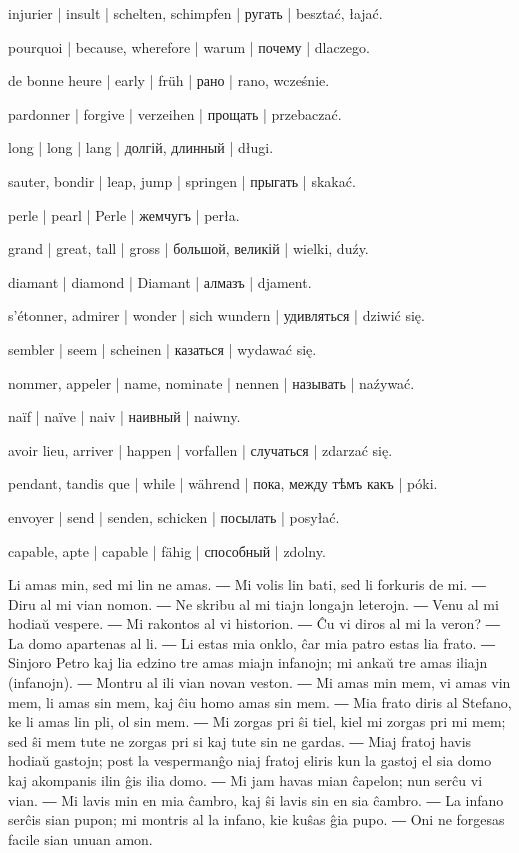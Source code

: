 \begin{ekzvocab}{1em}
 injurier | insult | schelten, schimpfen | ругать | besztać, łajać.

 pourquoi | because, wherefore | warum | почему | dlaczego.

 de bonne heure | early | früh | рано | rano, wcześnie.

 pardonner | forgive | verzeihen | прощать | przebaczać.

 long | long | lang | долгій, длинный | długi.

 sauter, bondir | leap, jump | springen | прыгать | skakać.

 perle | pearl | Perle | жемчугъ | perła.

 grand | great, tall | gross | большой, великій | wielki, duźy.

 diamant | diamond | Diamant | алмазъ | djament.

 s’étonner, admirer | wonder | sich wundern | удивляться | dziwić się.

 sembler | seem | scheinen | казаться | wydawać się.

 nommer, appeler | name, nominate | nennen | называть | naźywać.

 naïf | naïve | naiv | наивный | naiwny.

 avoir lieu, arriver | happen | vorfallen | случаться | zdarzać się.

 pendant, tandis que | while | während | пока, между тѣмъ какъ | póki.

 envoyer | send | senden, schicken | посылать | posyłać.

 capable, apte | capable | fähig | способный | zdolny.

\end{ekzvocab}



Li amas min, sed mi lin ne amas. ― Mi volis lin bati, sed li forkuris de mi. ― Diru al mi vian nomon. ― Ne skribu al mi tiajn longajn leterojn. ― Venu al mi hodiaŭ vespere. ― Mi rakontos al vi historion. ― Ĉu vi diros al mi la veron? ― La domo apartenas al li. ― Li estas mia onklo, ĉar mia patro estas lia frato. ― Sinjoro Petro kaj lia edzino tre amas miajn infanojn; mi ankaŭ tre amas iliajn (infanojn). ― Montru al ili vian novan veston. ― Mi amas min mem, vi amas vin mem, li amas sin mem, kaj ĉiu homo amas sin mem. ― Mia frato diris al Stefano, ke li amas lin pli, ol sin mem. ― Mi zorgas pri ŝi tiel, kiel mi zorgas pri mi mem; sed ŝi mem tute ne zorgas pri si kaj tute sin ne gardas. ― Miaj fratoj havis hodiaŭ gastojn; post la vespermanĝo niaj fratoj eliris kun la gastoj el sia domo kaj akompanis ilin ĝis ilia domo. ― Mi jam havas mian ĉapelon; nun serĉu vi vian. ― Mi lavis min en mia ĉambro, kaj ŝi lavis sin en sia ĉambro. ― La infano serĉis sian pupon; mi montris al la infano, kie kuŝas ĝia pupo. ― Oni ne forgesas facile sian unuan amon.


